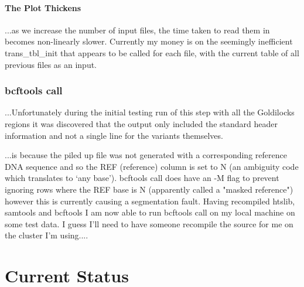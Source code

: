 \subsubsection{The Plot Thickens}

...as we increase the number of input files, the time taken to
read them in becomes non-linearly slower. Currently my money is on the seemingly
inefficient trans\_tbl\_init that appears to be called for each file, with the
current table of all previous files as an input.


\subsection{bcftools call}

...Unfortunately during the initial testing run of this step with all the
Goldilocks regions it was discovered that the output only included the standard
header information and not a single line for the variants themselves.

...is because the piled up file was not generated with a corresponding reference
DNA sequence and so the REF (reference) column is set to N (an ambiguity code
which translates to ‘any base’).  bcftools call does have an -M flag to prevent
ignoring rows where the REF base is N (apparently called a "masked reference")
however this is currently causing a segmentation fault.  Having recompiled
htslib, samtools and bcftools I am now able to run bcftools call on my local
machine on some test data. I guess I’ll need to have someone recompile the
source for me on the cluster I’m using....




\chapter{Current Status}

